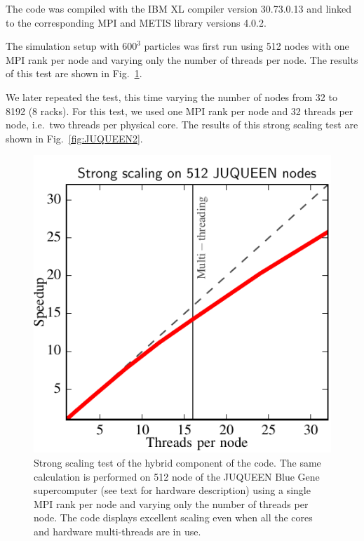 \documentclass{sig-alternate-05-2015}
\begin{document}
The code was compiled with the IBM XL compiler version \textsc{30.73.0.13} and
linked to the corresponding MPI and METIS library
versions \textsc{4.0.2}.

The simulation setup with $600^3$ particles was first run using
512 nodes with one MPI rank per node and varying only the number of threads per
node. The results of this test are shown in Fig.~\ref{fig:JUQUEEN1}.

We later repeated the test, this time varying the number of nodes from 32 to
8192 (8 racks).  For this test, we used one MPI rank per node and 32 threads per
node, i.e.~two threads per physical core. The results of this strong scaling
test are shown in Fig.~\ref{fig:JUQUEEN2}.


\begin{figure}
\centering
\includegraphics[width=\columnwidth]{Figures/scalingInNode}
\caption{Strong scaling test of the hybrid component of the code. The
  same calculation is performed on 512 node of the JUQUEEN Blue Gene
  supercomputer (see text for hardware description) using a single MPI
  rank per node and varying only the number of
  threads per node. The code displays excellent scaling even when all the cores and
  hardware multi-threads are in use. \label{fig:JUQUEEN1}}
\end{figure}  
\end{document}
